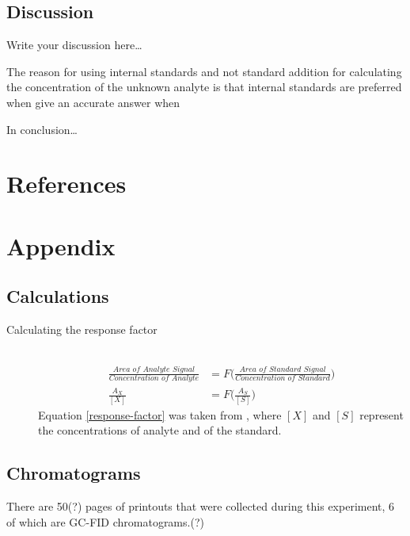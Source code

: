 \documentclass[a4paper, 12pt]{article}
\begin{document}
\subsection{Discussion}
Write your discussion here\dots

The reason for using internal standards and not standard addition for calculating the concentration of the unknown analyte is that internal standards are preferred when give an accurate answer when 

In conclusion\dots


\section{References}
\printbibliography


\section{Appendix}

\subsection{Calculations}

\begin{description}
	\item[Calculating the response factor] \hfill \\
		\begin{equation} \label{response-factor}
		\begin{split}
			\frac{\textit{Area of Analyte Signal}}{\textit{Concentration of Analyte}} & = F\Bigg(\frac{\textit{Area of Standard Signal}}{\textit{Concentration of Standard}}\Bigg) \\
			\frac{A_X}{[X]} & = F\Bigg(\frac{A_S}{[S]}\Bigg)
		\end{split}
		\end{equation}
			Equation \ref{response-factor} was taken from \cite{harris_quantitative_2010}, where $[X]$ and $[S]$ represent the concentrations of analyte and of the standard.
\end{description}

\subsection{Chromatograms}
There are 50(?) pages of printouts that were collected during this experiment, 6 of which are GC-FID chromatograms.(?)


\end{document}
